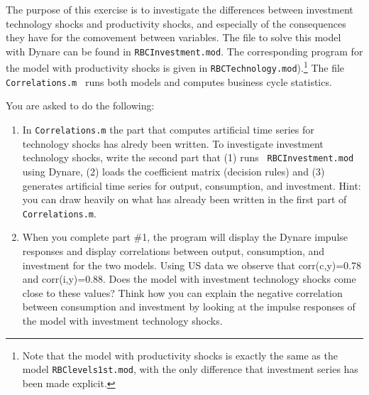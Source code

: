 \documentclass{article}
\begin{document}
\noindent The purpose of this exercise is to investigate the differences
between investment technology shocks and productivity shocks, and especially
of the consequences they have for the comovement between variables. The file
to solve this model with Dynare can be found in \texttt{RBCInvestment.mod}.
The corresponding program for the model with productivity shocks is given in 
\texttt{RBCTechnology.mod}).\footnote{%
Note that the model with productivity shocks is exactly the same as the
model \texttt{RBClevels1st.mod}, with the only difference that investment
series has been made explicit.} The file \texttt{Correlations.m} \ runs both
models and computes business cycle statistics. 

You are asked to do the following:

\begin{enumerate}
\item In \texttt{Correlations.m} the part that computes artificial time
series for technology shocks has alredy been written. To investigate
investment technology shocks, write the second part that (1) runs \texttt{%
RBCInvestment.mod} using Dynare, (2) loads the coefficient matrix (decision
rules) and (3) generates artificial time series for output, consumption, and
investment. Hint: you can draw heavily on what has already been written in
the first part of \texttt{Correlations.m}.

\item When you complete part \#1, the program will display the Dynare
impulse responses and display correlations between output, consumption, and
investment for the two models. Using US data we observe that corr(c,y)=0.78
and corr(i,y)=0.88. Does the model with investment technology shocks come
close to these values? Think how you can explain the negative correlation
between consumption and investment by looking at the impulse responses of
the model with investment technology shocks.
\end{enumerate}
\end{document}

